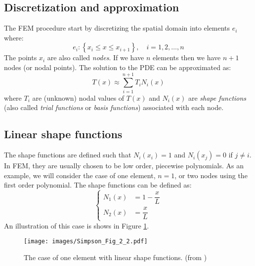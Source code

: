 \documentclass[a4paper,12pt]{article} %
\begin{document}
\subsection{Discretization and approximation}

The FEM procedure start by discretizing the spatial domain into elements $e_{i}$
where:
\begin{equation}
e_{i}: \left\{ x_{i} \leq x \leq x_{i+1} \right\},\quad i=1,2,\ldots,n
\end{equation}
The points $x_{i}$ are also called \textit{nodes}. If we have $n$ elements then we
have $n+1$ nodes (or nodal points).
The solution to the PDE can be approximated as:
\begin{equation}
T(x) \approx \sum_{i=1}^{n+1} T_{i} N_{i}(x)
\label{eq:sol_pde_approx}
\end{equation}
where $T_i$ are (unknown) nodal values of $T(x)$ and $N_{i}(x)$ are \textit{shape functions}
(also called \textit{trial functions} or \textit{basis functions}) associated with each node.


\subsection{Linear shape functions}
The shape functions are defined such that $N_{i}(x_{i}) = 1$ and $N_{i}(x_{j})=0$
if $j \neq i$. In FEM, they are usually chosen to be low order, piecewise polynomials.
As an example, we will consider the case of one element, $n=1$, or two nodes using
the first order polynomial. The shape functions can be defined as:
\begin{equation}
\begin{cases}
N_{1}(x) & = 1 - \dfrac{x}{L} \\[10pt]
N_{2}(x) & = \dfrac{x}{L}
\end{cases}
\label{eq:linear_shape_functions}
\end{equation}
An illustration of this case is shows in Figure \ref{fig:Simpson_2_2}.

\begin{figure}[H]
{\centering
\texttt{[image: images/Simpson\_Fig\_2\_2.pdf]}
\par}
\caption{The case of one element with linear shape functions. (from \cite{Simpson2017})}
\label{fig:Simpson_2_2}
\end{figure}
\end{document}
